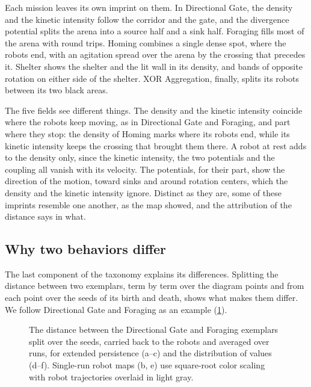 \documentclass[pdflatex,sn-apa]{sn-jnl}
\begin{document}
Each mission leaves its own imprint on them. In
Directional Gate, the density and the kinetic intensity follow the corridor and the gate, and the divergence potential
splits the arena into a source half and a sink half. Foraging fills most of the arena with round trips. Homing combines
a single dense spot, where the robots end, with an agitation spread over the arena by the crossing that precedes it.
Shelter shows the shelter and the lit wall in its density, and bands of opposite rotation on either side of the
shelter. XOR Aggregation, finally, splits its robots between its two black areas.

The five fields see different things. The density and the kinetic intensity coincide where the robots keep moving, as
in Directional Gate and Foraging, and part where they stop: the density of Homing marks where its robots end, while its
kinetic intensity keeps the crossing that brought them there. A robot at rest adds to the density only, since the
kinetic intensity, the two potentials and the coupling all vanish with its velocity. The potentials, for their part,
show the direction of the motion, toward sinks and around rotation centers, which the density and the kinetic intensity
ignore. Distinct as they are, some of these imprints resemble one another, as the map showed, and the attribution of the
distance says in what.

\subsection{Why two behaviors differ}
\label{sec:res_attribution}

The last component of the taxonomy explains its differences. Splitting the distance between two exemplars, term by
term over the diagram points and from each point over the seeds of its birth and death, shows what makes them differ.
We follow Directional Gate and Foraging as an example (\cref{fig:attribution}).

\begin{figure}[!htb]
\centering
{}
\caption{The distance between the Directional Gate and Foraging exemplars split over the seeds, carried back to the
robots and averaged over  runs, for extended persistence (a--c) and the distribution of values (d--f).
Single-run robot maps (b, e) use square-root color scaling with robot trajectories overlaid in light gray.}
\label{fig:attribution}
\end{figure}
\end{document}
